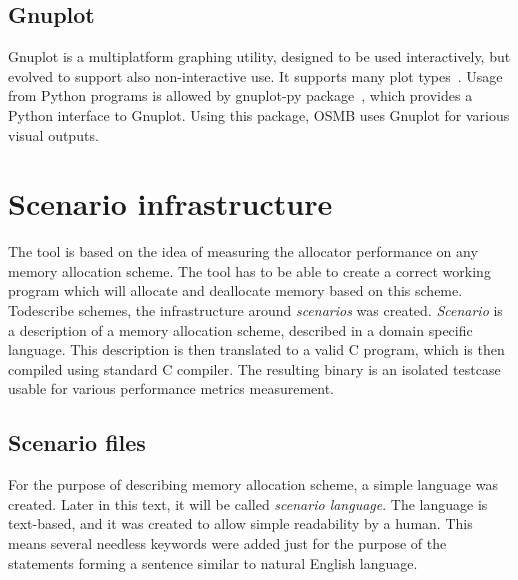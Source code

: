 \subsection{Gnuplot}

Gnuplot is a multiplatform graphing utility, designed to be used interactively, but evolved to support also non-interactive use. It supports many plot types~\cite{gnuplot}. Usage from Python programs is allowed by gnuplot-py package~\cite{gnuplot-py}, which provides a Python interface to Gnuplot. Using this package, OSMB uses Gnuplot for various visual outputs.

\section{Scenario infrastructure}
The tool is based on the idea of measuring the allocator performance on any
memory allocation scheme. The tool has to be able to create a correct working
program which will allocate and deallocate memory based on this scheme. Todescribe schemes, the infrastructure around {\em scenarios} was created.
{\em Scenario} is a description of a memory allocation scheme, described in a
domain specific language. This description is then translated to a valid C
program, which is then compiled using standard C compiler. The resulting binary
is an isolated testcase usable for various performance metrics measurement.
\subsection{Scenario files}
For the purpose of describing memory allocation scheme, a simple language was
created. Later in this text, it will be called {\em scenario language}. The
language is text-based, and it was created to allow simple readability by a
human. This means several needless keywords were added just for the purpose of
the statements forming a sentence similar to natural English language.

